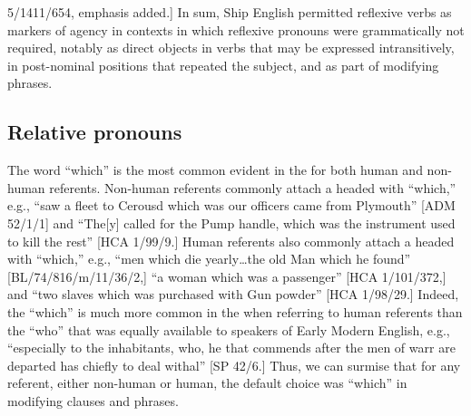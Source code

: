5/1411/654, emphasis added.] In sum, Ship English permitted reflexive verbs as markers of  agency in contexts in which reflexive pronouns were grammatically not required, notably as direct objects in verbs that may be expressed intransitively, in post-nominal positions that repeated the subject, and as part of modifying phrases. 

\subsection{{Relative pronouns}}%

The word “which” is the most common  evident in the  for both human and non-human referents. Non-human  referents commonly attach a  headed with “which,” e.g., “saw a fleet to Cerousd which was our officers came from Plymouth” [ADM 52/1/1] and “The[y] called for the Pump handle, which was the instrument used to kill the rest” [HCA 1/99/9.] Human  referents also commonly attach a  headed with “which,” e.g., “men which die yearly…the old Man which he found” [BL/74/816/m/11/36/2,] “a woman which was a passenger” [HCA 1/101/372,] and “two slaves which was purchased with Gun powder” [HCA 1/98/29.] Indeed, the  “which” is much more common in the  when referring to human referents than the  “who” that was equally available to speakers of Early Modern English, e.g., “especially to the inhabitants, who, he that commends after the men of warr are departed has chiefly to deal withal” [SP 42/6.] Thus, we can surmise that for any  referent, either non-human or human, the default  choice was “which” in modifying clauses and phrases. 

